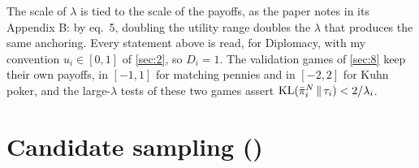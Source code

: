\documentclass[12pt,a4paper]{article}
\begin{document}
The scale of $\lambda$ is tied to the scale of the payoffs, as the paper notes in its Appendix B: by eq.~5, doubling the utility range doubles the $\lambda$ that produces the same anchoring.
Every statement above is read, for Diplomacy, with my convention $u_i \in [0, 1]$ of \cref{sec:2}, so $D_i = 1$.
The validation games of \cref{sec:8} keep their own payoffs, in $[-1, 1]$ for matching pennies and in $[-2, 2]$ for Kuhn poker, and the large-$\lambda$ tests of these two games assert $\operatorname{KL}(\bar{\pi}_i^{N} \,\|\, \tau_i) < 2 / \lambda_i$.

\section{Candidate sampling (\texorpdfstring{}{candidates.py})}\label{sec:5}
\end{document}
